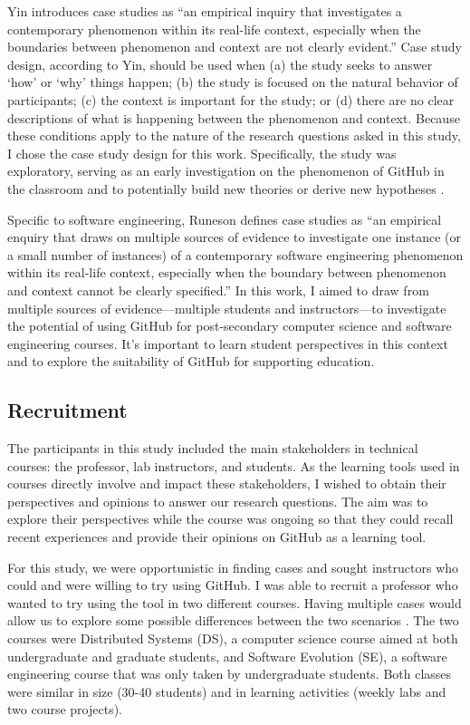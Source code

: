 Yin \cite{yin2013case} introduces case studies as ``an empirical inquiry that investigates a contemporary phenomenon within its real-life context, especially when the boundaries between phenomenon and context are not clearly evident.'' Case study design, according to Yin, should be used when (a) the study seeks to answer `how' or `why' things happen; (b) the study is focused on the natural behavior of participants; (c) the context is important for the study; or (d) there are no clear descriptions of what is happening between the phenomenon and context. Because these conditions apply to the nature of the research questions asked in this study, I chose the case study design for this work. Specifically, the study was exploratory, serving as an early investigation on the phenomenon of GitHub in the classroom and to potentially build new theories or derive new hypotheses \cite{easterbrook2008selecting}.

Specific to software engineering, Runeson \cite{runeson2012case} defines case studies as ``an empirical enquiry that draws on multiple sources of evidence to investigate one instance (or a small number of instances) of a contemporary software engineering phenomenon within its real-life context, especially when the boundary between phenomenon and context cannot be clearly specified.'' In this work, I aimed to draw from multiple sources of evidence---multiple students and instructors---to investigate the potential of using GitHub for post-secondary computer science and software engineering courses. It's important to learn student perspectives in this context and to explore the suitability of GitHub for supporting education.

\subsection{Recruitment}
The participants in this study included the main stakeholders in technical courses: the professor, lab instructors, and students. As the learning tools used in courses directly involve and impact these stakeholders, I wished to obtain their perspectives and opinions to answer our research questions. The aim was to explore their perspectives while the course was ongoing so that they could recall recent experiences and provide their opinions on GitHub as a learning tool.

For this study, we were opportunistic in finding cases and sought instructors who could and were willing to try using GitHub. I was able to recruit a professor who wanted to try using the tool in two different courses. Having multiple cases would allow us to explore some possible differences between the two scenarios \cite{yin2013case}. The two courses were Distributed Systems (DS), a computer science course aimed at both undergraduate and graduate students, and Software Evolution (SE), a software engineering course that was only taken by undergraduate students. Both classes were similar in size (30-40 students) and in learning activities (weekly labs and two course projects).

